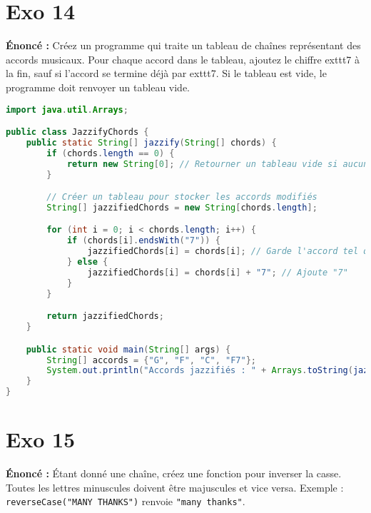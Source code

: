 \documentclass{article}
\begin{document}
\section*{Exo 14}
\noindent \textbf{Énoncé :} Créez un programme qui traite un tableau de chaînes représentant des accords musicaux. Pour chaque accord dans le tableau, ajoutez le chiffre 	exttt{7} à la fin, sauf si l'accord se termine déjà par 	exttt{7}. Si le tableau est vide, le programme doit renvoyer un tableau vide.

\begin{lstlisting}[language=Java]
import java.util.Arrays;

public class JazzifyChords {
    public static String[] jazzify(String[] chords) {
        if (chords.length == 0) {
            return new String[0]; // Retourner un tableau vide si aucun accord
        }

        // Créer un tableau pour stocker les accords modifiés
        String[] jazzifiedChords = new String[chords.length];

        for (int i = 0; i < chords.length; i++) {
            if (chords[i].endsWith("7")) {
                jazzifiedChords[i] = chords[i]; // Garde l'accord tel quel
            } else {
                jazzifiedChords[i] = chords[i] + "7"; // Ajoute "7"
            }
        }

        return jazzifiedChords;
    }

    public static void main(String[] args) {
        String[] accords = {"G", "F", "C", "F7"};
        System.out.println("Accords jazzifiés : " + Arrays.toString(jazzify(accords)));
    }
}
\end{lstlisting}
\clearpage

\section*{Exo 15}
\noindent \textbf{Énoncé :} Étant donné une chaîne, créez une fonction pour inverser la casse. Toutes les lettres minuscules doivent être majuscules et vice versa.\newline
Exemple : \texttt{reverseCase("MANY THANKS")} renvoie \texttt{"many thanks"}.
\end{document}
